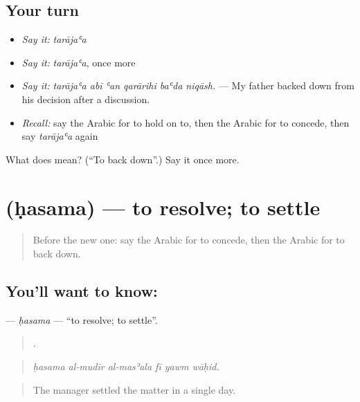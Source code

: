 \subsection*{Your turn}
\begin{itemize}
\raggedright
  \item \emph{Say it:} \emph{tarājaʿa}
  \item \emph{Say it:} \emph{tarājaʿa}, once more
  \item \emph{Say it:} \emph{tarājaʿa abī ʿan qarārihi baʿda niqāsh.} — My father backed down from his decision after a discussion.
  \item \emph{Recall:} say the Arabic for to hold on to, then the Arabic for to concede, then say \emph{tarājaʿa} again
\end{itemize}

\begin{tcolorbox}[breakable,colback=teal!4,colframe=teal!35!black,title={Before you move on}]
What does  mean? (\textquotedblleft{}To back down\textquotedblright{}.) Say it once more.
\end{tcolorbox}
\section[\texorpdfstring{\ar{حسم} (ḥasama)}{حسم (ḥasama)}]{ (ḥasama) — to resolve; to settle}

\label{lesson:AR-C373-hasama}



\begin{quote}
Before the new one: say the Arabic for to concede, then the Arabic for to back down.
\end{quote}

\subsection*{You'll want to know: }
\textbf{} — \emph{ḥasama} — \textquotedblleft{}to resolve; to settle\textquotedblright{}.

\begin{quote}
     .
\end{quote}

\begin{quote}
\emph{ḥasama al-mudīr al-masʾala fī yawm wāḥid.}
\end{quote}

\begin{quote}
The manager settled the matter in a single day.
\end{quote}


